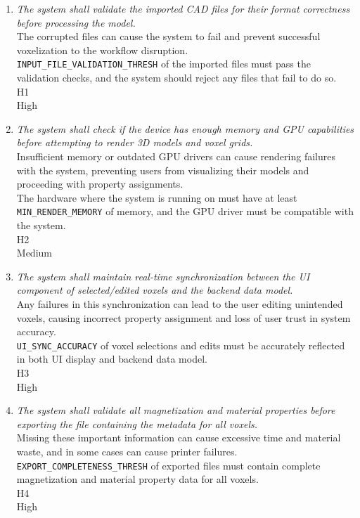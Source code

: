 \documentclass{article}
\begin{document}
\begin{enumerate}
\renewcommand{\labelenumi}{SCR \arabic{enumi}.}

\item \emph{The system shall validate the imported CAD files for their format correctness before processing the model.}\\
     The corrupted files can cause the system to fail and prevent successful voxelization to the workflow disruption.\\
     \texttt{INPUT\_FILE\_VALIDATION\_THRESH} of the imported files must pass the validation checks, and the system should reject any files that fail to do so.\\
     H1\\
     High

\item \emph{The system shall check if the device has enough memory and GPU capabilities before attempting to render 3D models and voxel grids.}\\
     Insufficient memory or outdated GPU drivers can cause rendering failures with the system, preventing users from visualizing their models and proceeding with property assignments.\\
     The hardware where the system is running on must have at least \texttt{MIN\_RENDER\_MEMORY} of memory, and the GPU driver must be compatible with the system.\\
     H2\\
     Medium

\item \emph{The system shall maintain real-time synchronization between the UI component of selected/edited voxels and the backend data model.}\\
     Any failures in this synchronization can lead to the user editing unintended voxels, causing incorrect property assignment and loss of user trust in system accuracy.\\
     \texttt{UI\_SYNC\_ACCURACY} of voxel selections and edits must be accurately reflected in both UI display and backend data model.\\
     H3\\
     High

\item \emph{The system shall validate all magnetization and material properties before exporting the file containing the metadata for all voxels.}\\
     Missing these important information can cause excessive time and material waste, and in some cases can cause printer failures.\\
     \texttt{EXPORT\_COMPLETENESS\_THRESH} of exported files must contain complete magnetization and material property data for all voxels.\\
     H4\\
     High


\end{enumerate}
\end{document}
